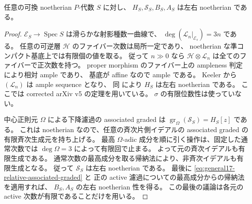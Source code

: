 \begin{proposition}
\label{prop:general17-strong-noetherian}
任意の可換 noetherian $P$-代数 $S$ に対し、
$H_S,\mathscr S_S,B_S,A_S$ は左右 noetherian である。
\end{proposition}

\begin{proof}
$\mathscr E_S\to\operatorname{Spec}S$ は滑らかな射影種数一曲線で、
$\deg(\mathcal L_n|_{\mathscr E_s})=3n$ である。
任意の可逆層 $\mathcal H$ のファイバー次数は局所一定であり、
noetherian な準コンパクト基底上では有限個の値を取る。
従って $n\gg0$ なら $\mathcal H\otimes\mathcal L_n$ は全てのファイバーで正次数を持つ。
proper morphism のファイバー上の ampleness 判定
\cite[Proposition~2.7]{KeelerAmpleFilters} により相対 ample であり、
基底が affine なので ample である。
Keeler \cite[Theorem~1.3, condition~(A4)]{KeelerAmpleFilters} から
$(\mathcal L_n)$ は ample sequence となり、
同 \cite[Theorem~7.14]{KeelerAmpleFilters} により $H_S$ は左右 noetherian である。
ここでは corrected arXiv v5 の定理を用いている。
$\sigma$ の有限位数性は使っていない。

中心正則元 $\Omega$ による下降濾過の associated graded は
$\operatorname{gr}_{\Omega}(\mathscr S_S)=H_S[z]$ である。
これは noetherian なので、任意の斉次片側イデアルの associated graded の有限斉次生成元を持ち上げる。
最高 $\Omega$-adic 成分を順に引く操作は、固定した通常次数では
$\deg\Omega=3$ によって有限回で止まる。
よって元の斉次イデアルも有限生成である。
通常次数の最高成分を取る帰納法により、非斉次イデアルも有限生成となる。
従って $\mathscr S_S$ は左右 noetherian である。
最後に \eqref{eq:general17-relative-associated-graded} と
正の active 濾過についての最高成分からの帰納法を適用すれば、
$B_S,A_S$ の左右 noetherian 性を得る。
この最後の議論は各元の active 次数が有限であることだけを用いる。
\end{proof}




